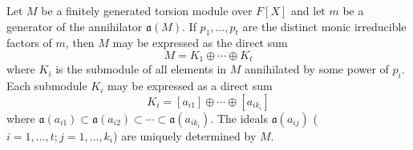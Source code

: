 Let $M$ be a finitely generated torsion module over $F[X]$ and let $m$ be a generator of the annihilator $\mathfrak{a}(M)$. If $p_1, \ldots, p_t$ are the distinct monic irreducible factors of $m$, then $M$ may be expressed as the direct sum
$$M = K_1 \oplus \cdots \oplus K_t$$
where $K_i$ is the submodule of all elements in $M$ annihilated by some power of $p_i$. Each submodule $K_i$ may be expressed as a direct sum
$$K_i = [a_{i1}] \oplus \cdots \oplus [a_{ik_i}]$$
where $\mathfrak{a}(a_{i1}) \subset \mathfrak{a}(a_{i2}) \subset \cdots \subset \mathfrak{a}(a_{ik_i})$. The ideals $\mathfrak{a}(a_{ij})$ ($i = 1, \ldots, t; j = 1, \ldots, k_i$) are uniquely determined by $M$.
